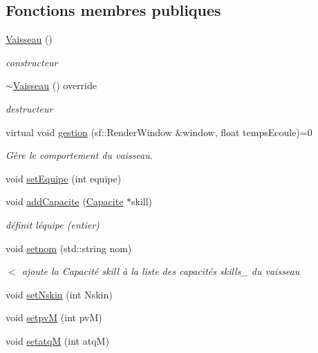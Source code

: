 \subsection*{Fonctions membres publiques}
\begin{DoxyCompactItemize}
\item 
\hyperlink{class_vaisseau_a86378a70f0d92fcc6c5c5973574b2b7d}{Vaisseau} ()
\begin{DoxyCompactList}\small\item\em constructeur \end{DoxyCompactList}\item 
\hyperlink{class_vaisseau_a3360bd62af7a7aaf5732b86d639a0674}{$\sim$\+Vaisseau} () override
\begin{DoxyCompactList}\small\item\em destructeur \end{DoxyCompactList}\item 
virtual void \hyperlink{class_vaisseau_a98c129568d478586684b1769fe465803}{gestion} (sf\+::\+Render\+Window \&window, float temps\+Ecoule)=0
\begin{DoxyCompactList}\small\item\em Gère le comportement du vaisseau. \end{DoxyCompactList}\item 
void \hyperlink{class_vaisseau_a1b3edda1f99d55cb5c0c7cbafe156af6}{set\+Equipe} (int equipe)
\item 
void \hyperlink{class_vaisseau_a04d7069231187e7dba26a06a0aaf2508}{add\+Capacite} (\hyperlink{class_capacite}{Capacite} $\ast$skill)
\begin{DoxyCompactList}\small\item\em définit l\textquotesingle{}équipe (entier) \end{DoxyCompactList}\item 
void \hyperlink{class_vaisseau_a46174e710a959996ac9ae56f11757e61}{setnom} (std\+::string nom)
\begin{DoxyCompactList}\small\item\em $<$ ajoute la {\ttfamily Capacité} skill à la liste des capacités skills\+\_\+ du vaisseau \end{DoxyCompactList}\item 
void \hyperlink{class_vaisseau_a0d57458dc32dde2d8326c20f25172bab}{set\+Nskin} (int Nskin)
\item 
void \hyperlink{class_vaisseau_a10a33c8fed1bb1530148e98313d80a87}{setpvM} (int pvM)
\item 
void \hyperlink{class_vaisseau_ac1eaf0b717e81471f259ce94ad0afb20}{setatqM} (int atqM)

\end{DoxyCompactItemize}
